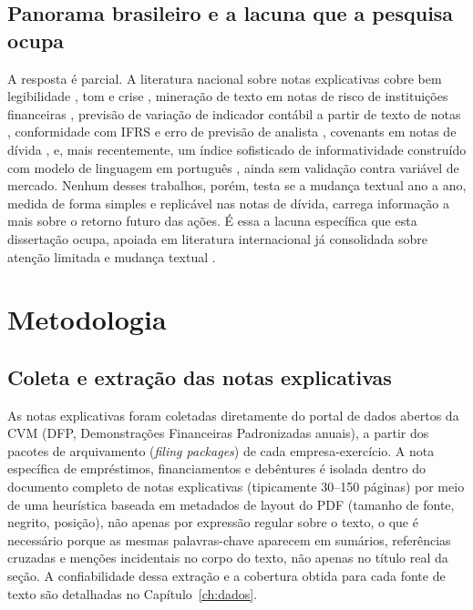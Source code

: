 \documentclass[a4paper,12pt]{report}
\begin{document}
\section{Panorama brasileiro e a lacuna que a pesquisa ocupa}
\label{sec:lacuna}

A resposta é parcial. A literatura nacional sobre notas explicativas cobre bem legibilidade \cite{borges,silva2019}, tom e crise \cite{muniz2025}, mineração de texto em notas de risco de instituições financeiras \cite{marcolin}, previsão de variação de indicador contábil a partir de texto de notas \cite{maeda2017}, conformidade com IFRS e erro de previsão de analista \cite{santos2018}, covenants em notas de dívida \cite{schiozer2021}, e, mais recentemente, um índice sofisticado de informatividade construído com modelo de linguagem em português \cite{costaneto2025}, ainda sem validação contra variável de mercado. Nenhum desses trabalhos, porém, testa se a mudança textual ano a ano, medida de forma simples e replicável nas notas de dívida, carrega informação a mais sobre o retorno futuro das ações. É essa a lacuna específica que esta dissertação ocupa, apoiada em literatura internacional já consolidada sobre atenção limitada e mudança textual \cite{cohen2020,amelzadeh2016,brown2011}.

\chapter{Metodologia}
\label{ch:metodologia}

\section{Coleta e extração das notas explicativas}
\label{sec:coleta}

As notas explicativas foram coletadas diretamente do portal de dados abertos da CVM (DFP, Demonstrações Financeiras Padronizadas anuais), a partir dos pacotes de arquivamento (\textit{filing packages}) de cada empresa-exercício. A nota específica de empréstimos, financiamentos e debêntures é isolada dentro do documento completo de notas explicativas (tipicamente 30--150 páginas) por meio de uma heurística baseada em metadados de layout do PDF (tamanho de fonte, negrito, posição), não apenas por expressão regular sobre o texto, o que é necessário porque as mesmas palavras-chave aparecem em sumários, referências cruzadas e menções incidentais no corpo do texto, não apenas no título real da seção. A confiabilidade dessa extração e a cobertura obtida para cada fonte de texto são detalhadas no Capítulo~\ref{ch:dados}.
\end{document}
